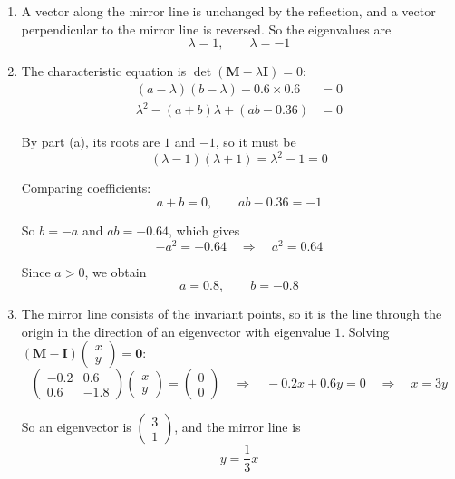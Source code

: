 \documentclass[leqno]{article}
\begin{document}
\begin{enumerate}[
  label=\textbf{\arabic*.},
  leftmargin=*,
  topsep=0pt,
  partopsep=0pt,
  parsep=0pt
]
\vspace*{10pt}

\begin{djsSolution}
\begin{enumerate}[label=\textbf{(\alph*)}, start=1]
  \item A vector along the mirror line is unchanged by the reflection, and a vector perpendicular to the mirror line is reversed. So the eigenvalues are
\[
\lambda=1,\qquad \lambda=-1
\]

  \item The characteristic equation is \(\det(\mathbf{M}-\lambda\mathbf{I})=0\):
\begin{align*}
(a-\lambda)(b-\lambda)-0.6\times0.6&=0\\
\lambda^2-(a+b)\lambda+(ab-0.36)&=0
\end{align*}

By part (a), its roots are \(1\) and \(-1\), so it must be
\[
(\lambda-1)(\lambda+1)=\lambda^2-1=0
\]

Comparing coefficients:
\[
a+b=0,\qquad ab-0.36=-1
\]

So \(b=-a\) and \(ab=-0.64\), which gives
\[
-a^2=-0.64\quad\Longrightarrow\quad a^2=0.64
\]

Since \(a>0\), we obtain
\[
a=0.8,\qquad b=-0.8
\]

  \item The mirror line consists of the invariant points, so it is the line through the origin in the direction of an eigenvector with eigenvalue \(1\). Solving \((\mathbf{M}-\mathbf{I})\begin{pmatrix}x\\y\end{pmatrix}=\mathbf{0}\):
\[
\begin{pmatrix}-0.2 & 0.6\\ 0.6 & -1.8\end{pmatrix}\begin{pmatrix}x\\y\end{pmatrix}=\begin{pmatrix}0\\0\end{pmatrix}\quad\Longrightarrow\quad -0.2x+0.6y=0\quad\Longrightarrow\quad x=3y
\]

So an eigenvector is \(\begin{pmatrix}3\\1\end{pmatrix}\), and the mirror line is
\[
y=\dfrac{1}{3}x
\]


\end{enumerate}
\end{djsSolution}
\end{enumerate}
\end{document}

